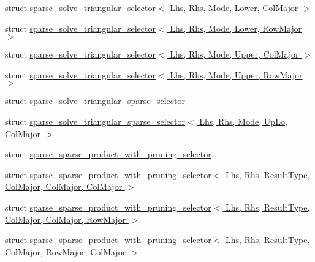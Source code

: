 \begin{DoxyCompactItemize}
struct \hyperlink{struct_eigen_1_1internal_1_1sparse__solve__triangular__selector_3_01_lhs_00_01_rhs_00_01_mode_00_01_lower_00_01_col_major_01_4}{sparse\+\_\+solve\+\_\+triangular\+\_\+selector$<$ Lhs, Rhs, Mode, Lower, Col\+Major $>$}
\item 
struct \hyperlink{struct_eigen_1_1internal_1_1sparse__solve__triangular__selector_3_01_lhs_00_01_rhs_00_01_mode_00_01_lower_00_01_row_major_01_4}{sparse\+\_\+solve\+\_\+triangular\+\_\+selector$<$ Lhs, Rhs, Mode, Lower, Row\+Major $>$}
\item 
struct \hyperlink{struct_eigen_1_1internal_1_1sparse__solve__triangular__selector_3_01_lhs_00_01_rhs_00_01_mode_00_01_upper_00_01_col_major_01_4}{sparse\+\_\+solve\+\_\+triangular\+\_\+selector$<$ Lhs, Rhs, Mode, Upper, Col\+Major $>$}
\item 
struct \hyperlink{struct_eigen_1_1internal_1_1sparse__solve__triangular__selector_3_01_lhs_00_01_rhs_00_01_mode_00_01_upper_00_01_row_major_01_4}{sparse\+\_\+solve\+\_\+triangular\+\_\+selector$<$ Lhs, Rhs, Mode, Upper, Row\+Major $>$}
\item 
struct \hyperlink{struct_eigen_1_1internal_1_1sparse__solve__triangular__sparse__selector}{sparse\+\_\+solve\+\_\+triangular\+\_\+sparse\+\_\+selector}
\item 
struct \hyperlink{struct_eigen_1_1internal_1_1sparse__solve__triangular__sparse__selector_3_01_lhs_00_01_rhs_00_0103d70089ab1c1a5e4529163773532981}{sparse\+\_\+solve\+\_\+triangular\+\_\+sparse\+\_\+selector$<$ Lhs, Rhs, Mode, Up\+Lo, Col\+Major $>$}
\item 
struct \hyperlink{struct_eigen_1_1internal_1_1sparse__sparse__product__with__pruning__selector}{sparse\+\_\+sparse\+\_\+product\+\_\+with\+\_\+pruning\+\_\+selector}
\item 
struct \hyperlink{struct_eigen_1_1internal_1_1sparse__sparse__product__with__pruning__selector_3_01_lhs_00_01_rhs_a7892c8b610053f5d59f33edb611e816}{sparse\+\_\+sparse\+\_\+product\+\_\+with\+\_\+pruning\+\_\+selector$<$ Lhs, Rhs, Result\+Type, Col\+Major, Col\+Major, Col\+Major $>$}
\item 
struct \hyperlink{struct_eigen_1_1internal_1_1sparse__sparse__product__with__pruning__selector_3_01_lhs_00_01_rhs_21e1c567bb33db704730c4eb2830e598}{sparse\+\_\+sparse\+\_\+product\+\_\+with\+\_\+pruning\+\_\+selector$<$ Lhs, Rhs, Result\+Type, Col\+Major, Col\+Major, Row\+Major $>$}
\item 
struct \hyperlink{struct_eigen_1_1internal_1_1sparse__sparse__product__with__pruning__selector_3_01_lhs_00_01_rhs_3de0f703bb5ed649050c959104d3eb1b}{sparse\+\_\+sparse\+\_\+product\+\_\+with\+\_\+pruning\+\_\+selector$<$ Lhs, Rhs, Result\+Type, Col\+Major, Row\+Major, Col\+Major $>$}

\end{DoxyCompactItemize}
